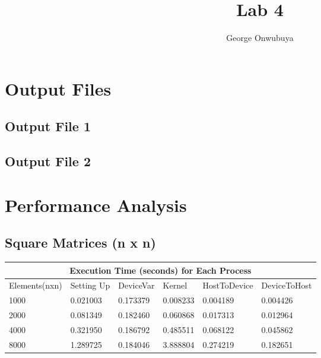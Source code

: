 \documentclass{article}
\title{Lab 4}
\author{George Onwubuya}
\begin{document}
\maketitle

\section{Output Files}
\subsection{Output File 1}

\subsection{Output File 2}

\section{Performance Analysis}
\subsection{Square Matrices (n x n)}

\begin{tabular}{ |p{2.5cm}||p{2cm}|p{2cm}|p{2cm}|p{2cm}|p{2cm}|  }
 \hline
 \multicolumn{6}{|c|}{Execution Time (seconds) for Each Process } \\
 \hline
 Elements(nxn) & Setting Up & DeviceVar & Kernel & HostToDevice & DeviceToHost\\
 \hline
 1000 & 0.021003 & 0.173379 & 0.008233 & 0.004189 & 0.004426\\
 \hline
 2000 & 0.081349 & 0.182460 & 0.060868 & 0.017313 & 0.012964\\
 \hline
 4000 & 0.321950 & 0.186792 & 0.485511 & 0.068122 & 0.045862\\
 \hline
 8000 & 1.289725  & 0.184046 & 3.888804 & 0.274219 & 0.182651\\
  \hline
  \end{tabular}
  \\
  \\
  \\
\end{document}
